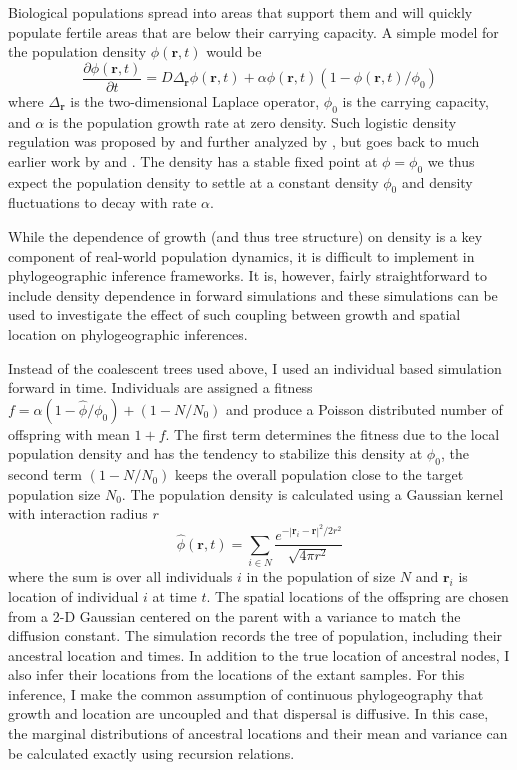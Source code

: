 \documentclass[aps,rmp, twocolumn]{revtex4}
\newcommand{\rvec}{\mathbf{r}}
\begin{document}
Biological populations spread into areas that support them and will quickly populate fertile areas that are below their carrying capacity.
A simple model for the population density $\phi(\rvec,t)$ would be
\begin{equation}
    \label{eq:FKPP}
    \frac{\partial \phi(\rvec,t)}{\partial t} = D \Delta_{\rvec} \phi(\rvec,t) + \alpha \phi(\rvec,t)(1-\phi(\rvec,t)/\phi_0)
\end{equation}
where $ \Delta_{\rvec}$ is the two-dimensional Laplace operator, $\phi_0$ is the carrying capacity, and $\alpha$ is the population growth rate at zero density.
Such logistic density regulation was proposed by \citet{bolker_using_1997} and further analyzed by \citet{etheridge_survival_2004}, but goes back to much earlier work by \citet{fisher_wave_1937} and \citet{KPP1937}.
The density has a stable fixed point at $\phi=\phi_0$ we thus expect the population density to settle at a constant density $\phi_0$ and density fluctuations to decay with rate $\alpha$.

While the dependence of growth (and thus tree structure) on density is a key component of real-world population dynamics, it is difficult to implement in phylogeographic inference frameworks.
It is, however, fairly straightforward to include density dependence in forward simulations and these simulations can be used to investigate the effect of such coupling between growth and spatial location on phylogeographic inferences.

Instead of the coalescent trees used above, I used an individual based simulation forward in time.
Individuals are assigned a fitness $f=\alpha(1-\hat{\phi}/\phi_0) + (1-N/N_0)$ and produce a Poisson distributed number of offspring with mean $1+f$.
The first term determines the fitness due to the local population density and has the tendency to stabilize this density at $\phi_0$, the second term $(1-N/N_0)$ keeps the overall population close to the target population size $N_0$.
The population density is calculated using a Gaussian kernel with interaction radius $r$
\begin{equation}
    \label{eq:density_estimator}
    \hat{\phi}(\rvec, t) = \sum_{i\in N} \frac{e^{-|\rvec_i - \rvec|^2/2r^2}}{\sqrt{4\pi r^2}}
\end{equation}
where the sum is over all individuals $i$ in the population of size $N$ and $\rvec_i$ is location of individual $i$ at time $t$.
The spatial locations of the offspring are chosen from a 2-D Gaussian centered on the parent with a variance to match the diffusion constant.
The simulation records the tree of population, including their ancestral location and times.
In addition to the true location of ancestral nodes, I also infer their locations from the locations of the extant samples.
For this inference, I make the common assumption of continuous phylogeography that growth and location are uncoupled and that dispersal is diffusive.
In this case, the marginal distributions of ancestral locations and their mean and variance can be calculated exactly using recursion relations.
\end{document}
